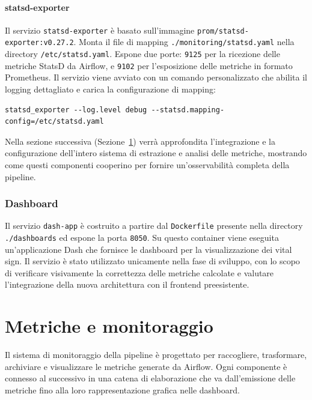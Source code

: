 \paragraph{statsd-exporter}
Il servizio \texttt{statsd-exporter} è basato sull’immagine \texttt{prom/statsd-exporter:v0.27.2}.  
Monta il file di mapping \texttt{./monitoring/statsd.yaml} nella directory \texttt{/etc/statsd.yaml}.  
Espone due porte: \texttt{9125} per la ricezione delle metriche StatsD da Airflow, e \texttt{9102} per l’esposizione delle metriche in formato Prometheus.  
Il servizio viene avviato con un comando personalizzato che abilita il logging dettagliato e carica la configurazione di mapping:
\begin{verbatim}
statsd_exporter --log.level debug --statsd.mapping-config=/etc/statsd.yaml
\end{verbatim}

Nella sezione successiva (Sezione~\ref{sec:implmonitoring}) verrà approfondita l’integrazione e la configurazione dell’intero sistema di estrazione e analisi delle metriche, mostrando come questi componenti cooperino per fornire un’osservabilità completa della pipeline.


\subsubsection{Dashboard}

Il servizio \texttt{dash-app} è costruito a partire dal \texttt{Dockerfile} presente nella directory \texttt{./dashboards} ed espone la porta \texttt{8050}.  
Su questo container viene eseguita un’applicazione Dash che fornisce le dashboard per la visualizzazione dei vital sign.  
Il servizio è stato utilizzato unicamente nella fase di sviluppo, con lo scopo di verificare visivamente la correttezza delle metriche calcolate e valutare l’integrazione della nuova architettura con il frontend preesistente.  

\section{Metriche e monitoraggio}
\label{sec:implmonitoring}


Il sistema di monitoraggio della pipeline è progettato per raccogliere, trasformare, archiviare e visualizzare le metriche generate da Airflow.  
Ogni componente è connesso al successivo in una catena di elaborazione che va dall’emissione delle metriche fino alla loro rappresentazione grafica nelle dashboard.  

